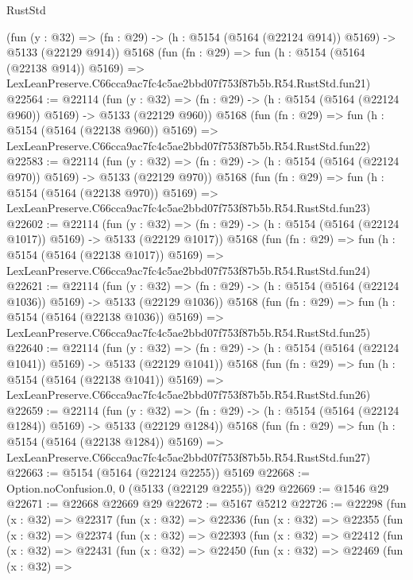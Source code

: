 \begin{lexlean}{RustStd}
\begin{coremodule}
    (fun (y : @32) => (fn : @29) -> (h : @5154 (@5164 (@22124 @914)) @5169) -> @5133 (@22129 @914))
    @5168
    (fun (fn : @29) =>
    fun (h : @5154 (@5164 (@22138 @914)) @5169) =>
    LexLeanPreserve.C66cca9ac7fc4c5ae2bbd07f753f87b5b.R54.RustStd.fun21)
@22564 := @22114
    (fun (y : @32) => (fn : @29) -> (h : @5154 (@5164 (@22124 @960)) @5169) -> @5133 (@22129 @960))
    @5168
    (fun (fn : @29) =>
    fun (h : @5154 (@5164 (@22138 @960)) @5169) =>
    LexLeanPreserve.C66cca9ac7fc4c5ae2bbd07f753f87b5b.R54.RustStd.fun22)
@22583 := @22114
    (fun (y : @32) => (fn : @29) -> (h : @5154 (@5164 (@22124 @970)) @5169) -> @5133 (@22129 @970))
    @5168
    (fun (fn : @29) =>
    fun (h : @5154 (@5164 (@22138 @970)) @5169) =>
    LexLeanPreserve.C66cca9ac7fc4c5ae2bbd07f753f87b5b.R54.RustStd.fun23)
@22602 := @22114
    (fun (y : @32) =>
    (fn : @29) -> (h : @5154 (@5164 (@22124 @1017)) @5169) -> @5133 (@22129 @1017))
    @5168
    (fun (fn : @29) =>
    fun (h : @5154 (@5164 (@22138 @1017)) @5169) =>
    LexLeanPreserve.C66cca9ac7fc4c5ae2bbd07f753f87b5b.R54.RustStd.fun24)
@22621 := @22114
    (fun (y : @32) =>
    (fn : @29) -> (h : @5154 (@5164 (@22124 @1036)) @5169) -> @5133 (@22129 @1036))
    @5168
    (fun (fn : @29) =>
    fun (h : @5154 (@5164 (@22138 @1036)) @5169) =>
    LexLeanPreserve.C66cca9ac7fc4c5ae2bbd07f753f87b5b.R54.RustStd.fun25)
@22640 := @22114
    (fun (y : @32) =>
    (fn : @29) -> (h : @5154 (@5164 (@22124 @1041)) @5169) -> @5133 (@22129 @1041))
    @5168
    (fun (fn : @29) =>
    fun (h : @5154 (@5164 (@22138 @1041)) @5169) =>
    LexLeanPreserve.C66cca9ac7fc4c5ae2bbd07f753f87b5b.R54.RustStd.fun26)
@22659 := @22114
    (fun (y : @32) =>
    (fn : @29) -> (h : @5154 (@5164 (@22124 @1284)) @5169) -> @5133 (@22129 @1284))
    @5168
    (fun (fn : @29) =>
    fun (h : @5154 (@5164 (@22138 @1284)) @5169) =>
    LexLeanPreserve.C66cca9ac7fc4c5ae2bbd07f753f87b5b.R54.RustStd.fun27)
@22663 := @5154 (@5164 (@22124 @2255)) @5169
@22668 := Option.noConfusion.{0, 0} (@5133 (@22129 @2255)) @29
@22669 := @1546 @29
@22671 := @22668 @22669 @29
@22672 := @5167 @5212
@22726 := @22298
    (fun (x : @32) =>
    @22317
      (fun (x : @32) =>
      @22336
        (fun (x : @32) =>
        @22355
          (fun (x : @32) =>
          @22374
            (fun (x : @32) =>
            @22393
              (fun (x : @32) =>
              @22412
                (fun (x : @32) =>
                @22431
                  (fun (x : @32) =>
                  @22450
                    (fun (x : @32) =>
                    @22469
                      (fun (x : @32) =>

\end{coremodule}
\end{lexlean}
